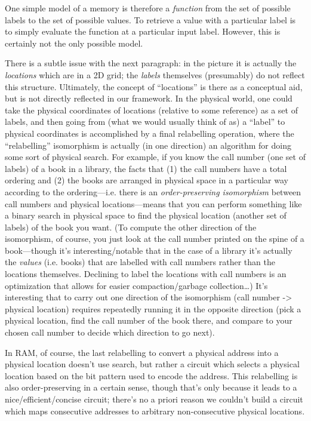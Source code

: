 \documentclass{jfp}
\begin{document}
One simple model of a memory is therefore a \emph{function} from the
set of possible labels to the set of possible values. To retrieve a
value with a particular label is to simply evaluate the function at a
particular input label.  However, this is certainly not the only
possible model.

\begin{commentary}
  There is a subtle issue with the next paragraph: in the picture it
  is actually the \emph{locations} which are in a 2D grid; the
  \emph{labels} themselves (presumably) do not reflect this structure.
  Ultimately, the concept of ``locations'' is there as a conceptual
  aid, but is not directly reflected in our framework.  In the
  physical world, one could take the physical coordinates of locations
  (relative to some reference) as a set of labels, and then going from
  (what we would usually think of as) a ``label'' to physical
  coordinates is accomplished by a final relabelling operation, where
  the ``relabelling'' isomorphism is actually (in one direction) an
  algorithm for doing some sort of physical search.  For example, if
  you know the call number (one set of labels) of a book in a library,
  the facts that (1) the call numbers have a total ordering and (2)
  the books are arranged in physical space in a particular way
  according to the ordering---i.e. there is an \emph{order-preserving
    isomorphism} between call numbers and physical locations---means
  that you can perform something like a binary search in physical
  space to find the physical location (another set of labels) of the
  book you want.  (To compute the other direction of the isomorphism,
  of course, you just look at the call number printed on the spine of
  a book---though it's interesting/notable that in the case of a
  library it's actually the \emph{values} (i.e. books) that are
  labelled with call numbers rather than the locations themselves.
  Declining to label the locations with call numbers is an
  optimization that allows for easier compaction/garbage
  collection\dots) It's interesting that to carry out one direction of
  the isomorphism (call number -> physical location) requires
  repeatedly running it in the opposite direction (pick a physical
  location, find the call number of the book there, and compare to
  your chosen call number to decide which direction to go next).

  In RAM, of course, the last relabelling to convert a physical
  address into a physical location doesn't use search, but rather a
  circuit which selects a physical location based on the bit pattern
  used to encode the address.  This relabelling is also
  order-preserving in a certain sense, though that's only because it
  leads to a nice/efficient/concise circuit; there's no a priori
  reason we couldn't build a circuit which maps consecutive addresses
  to arbitrary non-consecutive physical locations.
\end{commentary}
\end{document}
